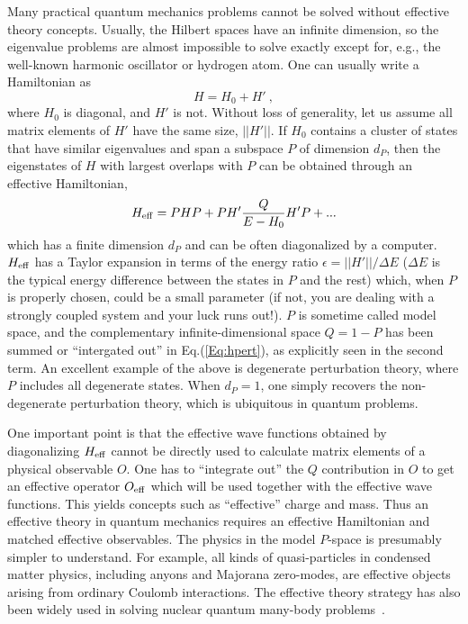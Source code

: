\documentclass[prd,aps,twocolumn,preprintnumbers,showpacs,nofootinbib,superscriptaddress,notitlepage]{revtex4-1}
\begin{document}
Many practical quantum mechanics problems cannot be solved
without effective theory concepts. Usually, the Hilbert spaces have an
infinite dimension, so the eigenvalue problems
are almost impossible to solve exactly except for, e.g., the well-known
harmonic oscillator or hydrogen
atom. One can usually write a Hamiltonian as
\begin{equation}
  H = H_0 + H' \ ,
\end{equation}
where $H_0$ is diagonal, and $H'$ is not. Without loss
of generality, let us assume all matrix elements of $H'$
have the same size, $||H'||$. If $H_0$ contains a cluster of states that have
similar eigenvalues and span a subspace $P$ of dimension $d_P$,
then the eigenstates of $H$ with largest overlaps
with $P$ can be obtained through an effective Hamiltonian,
\begin{equation}
\label{Eq:hpert}
   H_{\rm eff} = PHP + PH'\frac{Q}{E-H_0}H'P+ ...
\end{equation}
which has a finite dimension $d_P$ and can be often diagonalized
by a computer.
$H_{\rm eff}$ has a Taylor expansion in terms of the energy ratio
$\epsilon=||H'||/\Delta E$ ($\Delta E$ is the typical energy difference between the states in $P$ and
the rest) which, when $P$ is properly chosen, could be a small parameter (if not, you are dealing with
a strongly coupled system and your luck runs out!). $P$ is sometime called model space, and the complementary
infinite-dimensional space $Q=1-P$ has been summed or ``intergated
out'' in Eq.(\ref{Eq:hpert}), as explicitly seen in the second term.
An excellent example of the above is degenerate perturbation theory, where
$P$ includes all degenerate states. When $d_P=1$, one simply
recovers the non-degenerate perturbation theory, which is ubiquitous
in quantum problems.

One important point is that
the effective wave functions obtained by diagonalizing
$H_{\rm eff}$ cannot be directly used to calculate
matrix elements of a physical observable $O$. One has to ``integrate
out'' the $Q$ contribution in $O$ to get an effective operator $O_{\rm eff}$
which will be used together with the effective wave functions. This
yields concepts such as ``effective'' charge and mass.
Thus an effective theory in quantum mechanics requires an effective Hamiltonian
and matched effective observables. The physics in the model $P$-space is presumably
simpler to understand. For example, all kinds of quasi-particles in condensed
matter physics, including anyons and Majorana zero-modes, are
effective objects arising from ordinary Coulomb interactions.
The effective theory strategy has also been widely used in solving nuclear quantum
many-body problems~\cite{Drischler:2019xuo}.
\end{document}
